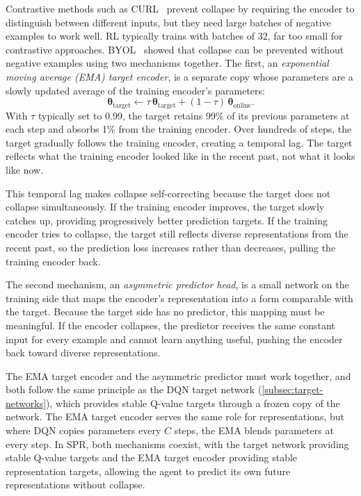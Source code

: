 \smallskip
Contrastive methods such as CURL~\citep{laskin2020curl} prevent
collapse by requiring the encoder to distinguish between different
inputs, but they need large batches of negative examples to work
well. RL typically trains with batches of 32, far too small for
contrastive approaches. BYOL~\citep{grill2020bootstrap} showed that
collapse can be prevented without negative examples using two
mechanisms together. The first, an \emph{exponential moving average
(EMA) target encoder}, is a separate copy whose parameters are a
slowly updated average of the training encoder's parameters:
%
\begin{equation}
\label{eq:ema-update}
\boldsymbol{\theta}_{\text{target}}
  \leftarrow \tau\, \boldsymbol{\theta}_{\text{target}}
  + (1 - \tau)\, \boldsymbol{\theta}_{\text{online}}.
\end{equation}
%
With $\tau$ typically set to 0.99, the target retains 99\% of its
previous parameters at each step and absorbs 1\% from the training
encoder. Over hundreds of steps, the target gradually follows the
training encoder, creating a temporal lag. The target reflects what
the training encoder looked like in the recent past, not what it
looks like now.

\smallskip
This temporal lag makes collapse self-correcting because the target
does not collapse simultaneously. If the training encoder improves,
the target slowly catches up, providing progressively better
prediction targets. If the training encoder tries to collapse, the
target still reflects diverse representations from the recent past,
so the prediction loss increases rather than decreases, pulling the
training encoder back.

\smallskip
The second mechanism, an \emph{asymmetric predictor head}, is a small
network on the training side that maps the encoder's representation
into a form comparable with the target. Because the target side has no
predictor, this mapping must be meaningful. If the encoder collapses,
the predictor receives the same constant input for every example and
cannot learn anything useful, pushing the encoder back toward diverse
representations.

\smallskip
The EMA target encoder and the asymmetric predictor must work
together, and both follow the same principle as the DQN target
network (\cref{subsec:target-networks}), which provides stable
Q-value targets through a frozen copy of the network. The EMA
target encoder serves the same role for representations, but where
DQN copies parameters every $C$ steps, the EMA blends parameters at
every step. In SPR, both mechanisms coexist, with the target network
providing stable Q-value targets and the EMA target encoder providing
stable representation targets, allowing the agent to predict its own
future representations without collapse.

